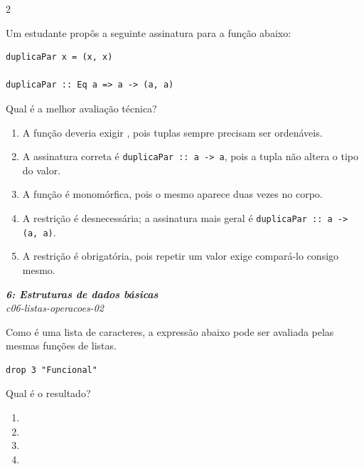 \documentclass[a4paper,10pt,brazil]{article}
\begin{document}
\begin{multicols}{2}
\begin{flushright}
\end{flushright}
Um estudante propôs a seguinte assinatura para a função abaixo:

\begin{verbatim}
duplicaPar x = (x, x)

duplicaPar :: Eq a => a -> (a, a)
\end{verbatim}

Qual é a melhor avaliação técnica?

\begin{enumerate}
  \item A função deveria exigir , pois tuplas sempre precisam ser ordenáveis.
  \item A assinatura correta é \texttt{duplicaPar :: a -> a}, pois a tupla não altera o tipo do valor.
  \item A função é monomórfica, pois o mesmo  aparece duas vezes no corpo.
  \item A restrição  é desnecessária; a assinatura mais geral é \texttt{duplicaPar :: a -> (a, a)}.
  \item A restrição  é obrigatória, pois repetir um valor exige compará-lo consigo mesmo.

\end{enumerate}

\begin{flushright}
  \footnotesize
  \textit{\textbf{6: Estruturas de dados básicas}}\\
  \textit{c06-listas-operacoes-02}\\

\end{flushright}
Como  é uma lista de caracteres, a expressão abaixo pode ser avaliada pelas mesmas funções de listas.
\begin{verbatim}
drop 3 "Funcional"
\end{verbatim}
Qual é o resultado?

\begin{enumerate}
  \item {}

  \item {}

  \item {}

  \item {}


\end{enumerate}
\end{multicols}
\end{document}
